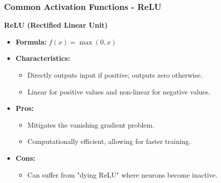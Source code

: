\documentclass[aspectratio=169]{beamer}
\begin{document}
\begin{frame}[fragile]
    \frametitle{Common Activation Functions - ReLU}
    \textbf{ReLU (Rectified Linear Unit)}
    \begin{itemize}
        \item \textbf{Formula:} $f(x) = \max(0, x)$
        \item \textbf{Characteristics:}
        \begin{itemize}
            \item Directly outputs input if positive; outputs zero otherwise.
            \item Linear for positive values and non-linear for negative values.
        \end{itemize}
        \item \textbf{Pros:}
        \begin{itemize}
            \item Mitigates the vanishing gradient problem.
            \item Computationally efficient, allowing for faster training.
        \end{itemize}
        \item \textbf{Cons:}
        \begin{itemize}
            \item Can suffer from "dying ReLU" where neurons become inactive.
        \end{itemize}
    \end{itemize}
\end{frame}
\end{document}
